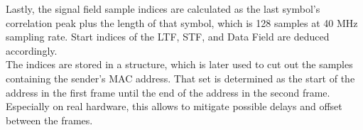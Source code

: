 Lastly, the signal field sample indices are calculated as the last symbol's correlation peak plus the length of that symbol, which is 128 samples at 40 MHz sampling rate. Start indices of the \gls{LTF}, \gls{STF}, and Data Field are deduced accordingly.\\

The indices are stored in a structure, which is later used to cut out the samples containing the sender's MAC address. That set is determined as the start of the address in the first frame until the end of the address in the second frame. Especially on real hardware, this allows to mitigate possible delays and offset between the frames.
